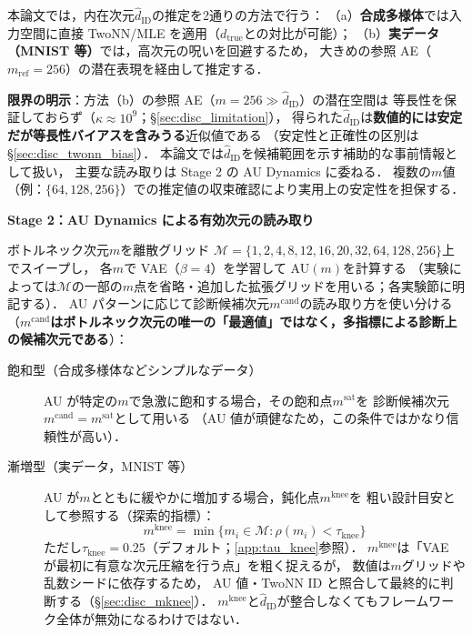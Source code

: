 \documentclass[11pt,a4paper]{jsarticle}
\newcommand{\dzopt}{m^{\mathrm{cand}}}
\newcommand{\dtrue}{d_{\mathrm{true}}}
\newcommand{\kap}{\kappa}
\newcommand{\dzsat}{m^{\mathrm{sat}}}
\newcommand{\mknee}{m^{\mathrm{knee}}}
\begin{document}
本論文では，内在次元$\hat{d}_\mathrm{ID}$の推定を2通りの方法で行う：
（a）\textbf{合成多様体}では入力空間に直接 TwoNN/MLE を適用（$\dtrue$との対比が可能）；
（b）\textbf{実データ（MNIST 等）}では，高次元の呪いを回避するため，
大きめの参照 AE（$m_{\mathrm{ref}} = 256$）の潜在表現を経由して推定する．

\textbf{限界の明示}：方法（b）の参照 AE（$m = 256 \gg \hat{d}_\mathrm{ID}$）の潜在空間は
等長性を保証しておらず（$\kap \approx 10^9$；§\ref{sec:disc_limitation}），
得られた$\hat{d}_\mathrm{ID}$は\textbf{数値的には安定だが等長性バイアスを含みうる}近似値である
（安定性と正確性の区別は§\ref{sec:disc_twonn_bias}）．
本論文では$\hat{d}_\mathrm{ID}$を候補範囲を示す補助的な事前情報として扱い，
主要な読み取りは Stage 2 の AU Dynamics に委ねる．
複数の$m$値（例：$\{64, 128, 256\}$）での推定値の収束確認により実用上の安定性を担保する．

\textbf{Stage 2：AU Dynamics による有効次元の読み取り}

ボトルネック次元$m$を離散グリッド
$\mathcal{M} = \{1, 2, 4, 8, 12, 16, 20, 32, 64, 128, 256\}$上でスイープし，
各$m$で VAE（$\beta = 4$）を学習して AU$(m)$を計算する
（実験によっては$\mathcal{M}$の一部の$m$点を省略・追加した拡張グリッドを用いる；各実験節に明記する）．
AU パターンに応じて診断候補次元$\dzopt$の読み取り方を使い分ける
（\textbf{$\dzopt$はボトルネック次元の唯一の「最適値」ではなく，多指標による診断上の候補次元である}）：

\begin{description}
  \item[飽和型（合成多様体などシンプルなデータ）]
        AU が特定の$m$で急激に飽和する場合，その飽和点$\dzsat$を
        診断候補次元$\dzopt = \dzsat$として用いる
        （AU 値が頑健なため，この条件ではかなり信頼性が高い）．
  \item[漸増型（実データ，MNIST 等）]
        AU が$m$とともに緩やかに増加する場合，鈍化点$\mknee$を
        粗い設計目安として参照する（探索的指標）：
        \begin{equation}
          \mknee = \min\{m_i \in \mathcal{M} : \rho(m_i) < \tau_{\mathrm{knee}}\}
          \label{eq:mknee}
        \end{equation}
        ただし$\tau_{\mathrm{knee}} = 0.25$（デフォルト；\ref{app:tau_knee}参照）．
        $\mknee$は「VAE が最初に有意な次元圧縮を行う点」を粗く捉えるが，
        数値は$m$グリッドや乱数シードに依存するため，
        AU 値・TwoNN ID と照合して最終的に判断する（§\ref{sec:disc_mknee}）．
        $\mknee$と$\hat{d}_\mathrm{ID}$が整合しなくてもフレームワーク全体が無効になるわけではない．
\end{description}
\end{document}
